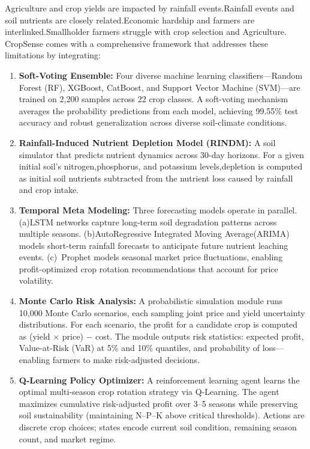 \documentclass[conference]{IEEEtran}
\begin{document}
Agriculture and crop yields are impacted by rainfall events.Rainfall events and soil nutrients are closely related.Economic hardship and farmers are interlinked.Smallholder farmers struggle with crop selection and Agriculture.
CropSense comes with a comprehensive framework that addresses these limitations by integrating:
\begin{enumerate}
  \item \textbf{Soft-Voting Ensemble:} Four diverse machine learning classifiers---Random Forest (RF), XGBoost, CatBoost, and Support Vector Machine (SVM)---are trained on 2,200 samples across 22 crop classes. A soft-voting mechanism averages the probability predictions from each model, achieving 99.55\% test accuracy and robust generalization across diverse soil-climate conditions.
  
  \item \textbf{Rainfall-Induced Nutrient Depletion Model (RINDM):} A soil simulator that predicts nutrient dynamics across 30-day horizons. For a given initial soil's nitrogen,phosphorus, and potassium levels,depletion is computed as initial soil nutrients subtracted from the nutrient loss caused by rainfall and crop intake.
  \item \textbf{Temporal Meta Modeling:} Three forecasting models operate in parallel. (a)LSTM networks capture long-term soil degradation patterns across multiple seasons. (b)AutoRegressive Integrated Moving Average(ARIMA) models short-term rainfall  forecasts to anticipate future nutrient leaching events. (c)~Prophet models seasonal market price fluctuations, enabling profit-optimized crop rotation recommendations that account for price volatility.
  
  \item \textbf{Monte Carlo Risk Analysis:} A probabilistic simulation module runs 10,000 Monte Carlo scenarios, each sampling joint price and yield uncertainty distributions. For each scenario, the profit for a candidate crop is computed as (yield $\times$ price) $-$ cost. The module outputs risk statistics: expected profit, Value-at-Risk (VaR) at 5\% and 10\% quantiles, and probability of loss---enabling farmers to make risk-adjusted decisions.
  
  \item \textbf{Q-Learning Policy Optimizer:} A reinforcement learning agent learns the optimal multi-season crop rotation strategy via Q-Learning. The agent maximizes cumulative risk-adjusted profit over 3--5 seasons while preserving soil sustainability (maintaining N--P--K above critical thresholds). Actions are discrete crop choices; states encode current soil condition, remaining season count, and market regime.
  

\end{enumerate}
\end{document}
